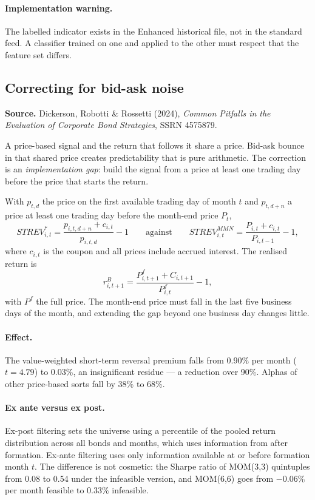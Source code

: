 \documentclass[11pt]{article}
\begin{document}
\paragraph{Implementation warning.} The labelled indicator exists in the
Enhanced historical file, not in the standard feed. A classifier trained on one
and applied to the other must respect that the feature set differs.

\subsection{Correcting for bid-ask noise}

\textbf{Source.} Dickerson, Robotti \& Rossetti (2024), \emph{Common Pitfalls in
the Evaluation of Corporate Bond Strategies}, SSRN 4575879.

A price-based signal and the return that follows it share a price. Bid-ask
bounce in that shared price creates predictability that is pure arithmetic. The
correction is an \emph{implementation gap}: build the signal from a price at
least one trading day before the price that starts the return.

With $p_{t,d}$ the price on the first available trading day of month $t$ and
$p_{t,d+n}$ a price at least one trading day before the month-end price $P_t$,
\begin{equation}
STREV^{*}_{i,t}=\frac{p_{i,t,d+n}+c_{i,t}}{p_{i,t,d}}-1
\qquad\text{against}\qquad
STREV^{MMN}_{i,t}=\frac{P_{i,t}+c_{i,t}}{P_{i,t-1}}-1,
\end{equation}
where $c_{i,t}$ is the coupon and all prices include accrued interest. The
realised return is
\begin{equation}
r^{B}_{i,t+1}=\frac{P^{f}_{i,t+1}+C_{i,t+1}}{P^{f}_{i,t}}-1,
\end{equation}
with $P^{f}$ the full price. The month-end price must fall in the last five
business days of the month, and extending the gap beyond one business day
changes little.

\paragraph{Effect.} The value-weighted short-term reversal premium falls from
0.90\% per month ($t=4.79$) to 0.03\%, an insignificant residue --- a reduction
over 90\%. Alphas of other price-based sorts fall by 38\% to 68\%.

\paragraph{Ex ante versus ex post.} Ex-post filtering sets the universe using a
percentile of the pooled return distribution across all bonds and months, which
uses information from after formation. Ex-ante filtering uses only information
available at or before formation month $t$. The difference is not cosmetic: the
Sharpe ratio of MOM(3,3) quintuples from 0.08 to 0.54 under the infeasible
version, and MOM(6,6) goes from $-0.06\%$ per month feasible to $0.33\%$
infeasible.
\end{document}
